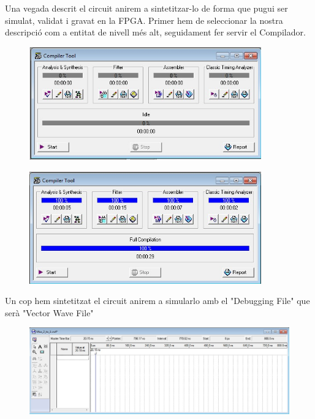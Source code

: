 \documentclass[12pt, a4papre]{article}
\begin{document}
	Una vegada descrit el circuit anirem a sintetitzar-lo de forma que pugui ser
simulat, validat i gravat en la FPGA. Primer hem de seleccionar la nostra descripció com a entitat de nivell més alt, seguidament fer servir el Compilador.
		\begin{figure}[H]
		\begin{center}
		\includegraphics[width=100mm]{simulador.jpeg}
		\end{center}
	\end{figure}
	\begin{figure}[H]
		\begin{center}
		\includegraphics[width=100mm]{simuladorfet.jpeg}
		\end{center}
	\end{figure}
	
	Un cop hem sintetitzat el circuit anirem a simularlo amb el "Debugging File" que serà "Vector Wave File"
	
	\begin{figure}[H]
		\begin{center}
		\includegraphics[width=140mm]{waveform.jpeg}
		\end{center}
	\end{figure}
	
\end{document}
